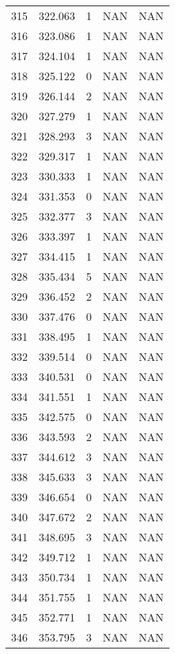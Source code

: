 \documentclass{article}
\begin{document}
\begin{longtable}{@{}lllll@{}}
				315 & 322.063 & 1    & NAN  & NAN  \\
				316 & 323.086 & 1    & NAN  & NAN  \\
				317 & 324.104 & 1    & NAN  & NAN  \\
				318 & 325.122 & 0    & NAN  & NAN  \\
				319 & 326.144 & 2    & NAN  & NAN  \\
				320 & 327.279 & 1    & NAN  & NAN  \\
				321 & 328.293 & 3    & NAN  & NAN  \\
				322 & 329.317 & 1    & NAN  & NAN  \\
				323 & 330.333 & 1    & NAN  & NAN  \\
				324 & 331.353 & 0    & NAN  & NAN  \\
				325 & 332.377 & 3    & NAN  & NAN  \\
				326 & 333.397 & 1    & NAN  & NAN  \\
				327 & 334.415 & 1    & NAN  & NAN  \\
				328 & 335.434 & 5    & NAN  & NAN  \\
				329 & 336.452 & 2    & NAN  & NAN  \\
				330 & 337.476 & 0    & NAN  & NAN  \\
				331 & 338.495 & 1    & NAN  & NAN  \\
				332 & 339.514 & 0    & NAN  & NAN  \\
				333 & 340.531 & 0    & NAN  & NAN  \\
				334 & 341.551 & 1    & NAN  & NAN  \\
				335 & 342.575 & 0    & NAN  & NAN  \\
				336 & 343.593 & 2    & NAN  & NAN  \\
				337 & 344.612 & 3    & NAN  & NAN  \\
				338 & 345.633 & 3    & NAN  & NAN  \\
				339 & 346.654 & 0    & NAN  & NAN  \\
				340 & 347.672 & 2    & NAN  & NAN  \\
				341 & 348.695 & 3    & NAN  & NAN  \\
				342 & 349.712 & 1    & NAN  & NAN  \\
				343 & 350.734 & 1    & NAN  & NAN  \\
				344 & 351.755 & 1    & NAN  & NAN  \\
				345 & 352.771 & 1    & NAN  & NAN  \\
				346 & 353.795 & 3    & NAN  & NAN  \\

\end{longtable}
\end{document}
